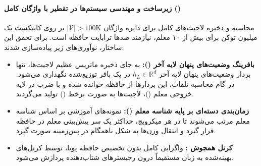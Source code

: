 \paragraph*{زیرساخت و مهندسی سیستم‌ها در تقطیر با واژگان کامل ()}
محاسبه و ذخیره لاجیت‌های کامل برای دایره واژگان $|\mathcal{V}| > 100\text{K}$ بر روی کانتکست یک میلیون توکن برای بیش از ۱۰ معلم، نیازمند صدها ترابایت حافظه است. برای تحقق این ساختار، نوآوری‌های زیر پیاده‌سازی شدند:
\begin{itemize}
    \item \textbf{بافرینگ وضعیت‌های پنهان لایه آخر ():} به جای ذخیره ماتریس عظیم لاجیت‌ها، تنها بردار وضعیت‌های پنهان لایه آخر $h_L \in \mathbb{R}^d$ در یک بافر توزیع‌شده نگهداری می‌شود. در گام محاسبه تلفات، این بردارها از حافظه خوانده شده و با ضرب در لایه خروجی معلم ()، لاجیت‌ها به صورت برخط () تولید می‌گردند.
    \item \textbf{زمان‌بندی دسته‌ای بر پایه شناسه معلم ():} نمونه‌های آموزشی بر اساس شناسه معلم مرتب می‌شوند تا در هر میکرو‌بچ، حداکثر یک سر پیش‌بینی معلم در حافظه  قرار گیرد و انتقال وزن‌ها به شکل ناهمگام در پس‌زمینه صورت گیرد.
    \item \textbf{کرنل همجوش :} واگرایی  کامل بدون تخصیص حافظه پویا، توسط کرنل‌های بهینه‌شده به زبان  مستقیماً درون رجیسترهای شتاب‌دهنده پردازش می‌شود.
\end{itemize}

